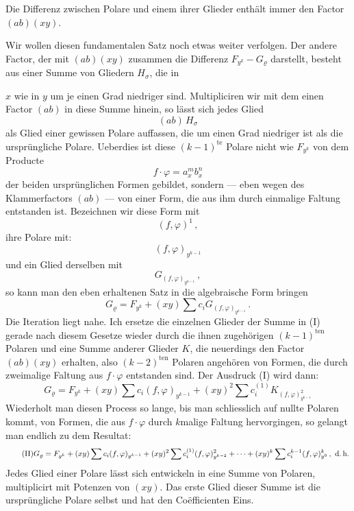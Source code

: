 \documentclass[11pt]{article}
\providecommand{\weberpage}[1]{}
\providecommand{\weq}[2]{\begin{equation}\tag{#1}#2\end{equation}}
\begin{document}
\glqq Die Differenz zwischen Polare und einem ihrer Glieder enthält immer den Factor $(ab)(xy)$.\grqq{}

Wir wollen diesen fundamentalen Satz noch etwas weiter verfolgen. Der andere Factor, der mit $(ab)(xy)$ zusammen die Differenz $F_{y^k}-G_\varrho$ darstellt, besteht aus einer Summe von Gliedern $H_\sigma$, die in


\weberpage{27}
$x$ wie in $y$ um je einen Grad niedriger sind. Multipliciren wir mit dem einen Factor $(ab)$ in diese Summe hinein, so lässt sich jedes Glied
\[
(ab)\,H_\sigma
\]
als Glied einer gewissen Polare auffassen, die um einen Grad niedriger ist als die ursprüngliche Polare. Ueberdies ist diese $(k-1)^{\text{te}}$ Polare nicht wie $F_{y^k}$ von dem Producte
\[
f\cdot\varphi=a_x^m b_x^n
\]
der beiden ursprünglichen Formen gebildet, sondern — eben wegen des Klammerfactors $(ab)$ — von einer Form, die aus ihm durch einmalige Faltung entstanden ist. Bezeichnen wir diese Form mit
\[
(f,\varphi)^1\,,
\]
ihre Polare mit:
\[
(f,\varphi)_{y^{k-1}}
\]
und ein Glied derselben mit
\[
G_{(f,\varphi)_{y^{k-1}}}\,,
\]
so kann man den eben erhaltenen Satz in die algebraische Form bringen
\weq{I}{G_\varrho=F_{y^k}+(xy)\sum c_iG_{(f,\varphi)_{y^{k-1}}}\,.}
Die Iteration liegt nahe. Ich ersetze die einzelnen Glieder der Summe in (I) gerade nach diesem Gesetze wieder durch die ihnen zugehörigen $(k-1)^{\text{ten}}$ Polaren und eine Summe anderer Glieder $K$, die neuerdings den Factor $(ab)(xy)$ erhalten, also $(k-2)^{\text{ten}}$ Polaren angehören von Formen, die durch zweimalige Faltung aus $f\cdot\varphi$ entstanden sind. Der Ausdruck (I) wird dann:
\[
G_\varrho=F_{y^k}+(xy)\sum c_i(f,\varphi)_{y^{k-1}}+(xy)^2\sum c_i^{(1)}K_{(f,\varphi)^2_{y^{k-1}}}
\]
Wiederholt man diesen Process so lange, bis man schliesslich auf nullte Polaren kommt, von Formen, die aus $f\cdot\varphi$ durch $k$malige Faltung hervorgingen, so gelangt man endlich zu dem Resultat:
\weq{II}{G_\varrho=F_{y^k}+(xy)\sum c_i(f,\varphi)_{y^{k-1}}+(xy)^2\sum c_i^{(1)}(f,\varphi)^2_{y^{k-2}}+\cdots+(xy)^k\sum c_i^{k-1}(f,\varphi)^k_{y^0}\,,\ \text{d.\,h.}}
\glqq Jedes Glied einer Polare lässt sich entwickeln in eine Summe von Polaren, multiplicirt mit Potenzen von $(xy)$. Das erste Glied dieser Summe ist die ursprüngliche Polare selbst und hat den Co\"efficienten Eins.\grqq{}
\end{document}
